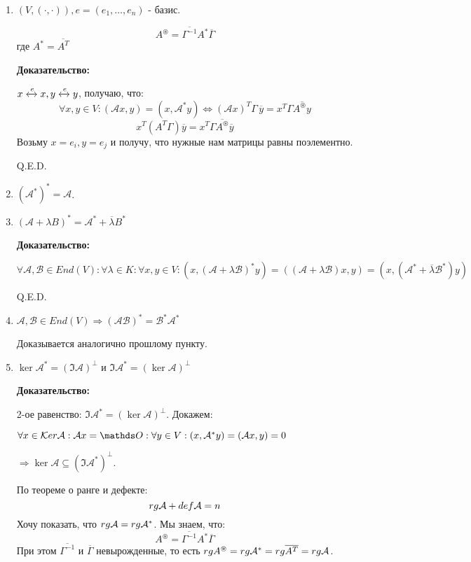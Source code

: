 \begin{enumerate}
    \item $(V, (\cdot, \cdot)), e= (e_1,\ldots, e_n)$ - базис.

$$A^\circledast = \overline{\Gamma^{-1}} A^* \overline{\Gamma}$$
где $A^* = \overline{A^T}$

\textbf{Доказательство:}

$x \xleftrightarrow{e}x, y \xleftrightarrow{e}y$, получаю, что:
$$\forall x,y \in V: (\mathcal{A}x,y) = (x, \mathcal{A}^* y) \Leftrightarrow (\mathcal{A}x)^T \Gamma\, \overline{y} = x^T \Gamma \overline{A^\circledast y} $$
$$x^T (A^T \Gamma)\overline{y}=x^T \Gamma \overline{A^\circledast}\overline{y}$$
Возьму $x = e_i, y= e_j$ и получу, что нужные нам матрицы равны поэлементно.

\hfill Q.E.D.

\item $(\mathcal{A}^*)^* = \mathcal{\mathcal{A}} $.
\item  $(\mathcal{A} + \lambda B)^* = \mathcal{A}^* +\overline{ \lambda} B^*$

\textbf{Доказательство:}

$\forall \mathcal{A}, \mathcal{B}\in End(V):\forall \lambda \in K:\forall x,y \in V: (x, (\mathcal{A } + \lambda \mathcal{B})^* y) = ((\mathcal{A} + \lambda \mathcal{B})x, y)= (x, (\mathcal{A}^* +\overline{\lambda}\mathcal{B}^* )y)$

\hfill Q.E.D.

\item $\mathcal{A}, \mathcal{B}\in End(V) \Rightarrow (\mathcal{A}\mathcal{B})^* = \mathcal{B}^* \mathcal{A}^*$

Доказывается аналогично прошлому пункту.

\item $\ker \mathcal{A}^* = (\Im \mathcal{A})^\perp$ и $\Im \mathcal{A}^* = (\ker \mathcal{A})^\perp$

\textbf{Доказательство:}

2-ое равенство: $\Im \mathcal{A}^* = (\ker \mathcal{A})^\perp$. Докажем:

$\forall x \in \ker \mathcal{A}: \mathcal{A}x = \zero : \forall y \in V: (x, \mathcal{A}^*y) = (\mathcal{A}x,y)=0$

$\Rightarrow \ker \mathcal{A} \subseteq (\Im \mathcal{A}^*)^\perp$. 

По теореме о ранге и дефекте: 
$$rg \mathcal{A} + def \mathcal{A} = n$$
Хочу показать, что $rg \mathcal{A} = rg \mathcal{A}^*$. Мы знаем, что:
$$A^\circledast = \overline{\Gamma^{-1}}A^* \overline{\Gamma^{}}$$
При этом $\overline{\Gamma^{-1}}$ и $\overline{\Gamma}$ невырожденные, то есть $rg A^\circledast = rg \mathcal{A}^* = rg \overline{A^T} = rg \mathcal{A}$.


\end{enumerate}
